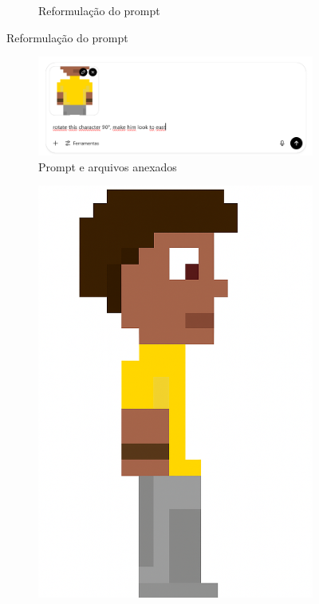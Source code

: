 \begin{figure}[htbp]
\begin{subfigure}{0.75\linewidth}
        \caption{\small Reformulação do prompt}
        \label{fig:chatGPT1c}
    \end{subfigure}
\end{figure}

\begin{figure}[htbp]
    \centering
    \caption{\small Processo da utilização 2 do chatGPT em julho/2025}
    \label{fig:chatGPT2}

    \begin{subfigure}{0.75\linewidth}
        \includegraphics[width=1\linewidth]{figs/chatGPT/visao_lateral/tela1.PNG}
        \caption{\small Prompt e arquivos anexados}
        \label{fig:chatGPT2a}
    \end{subfigure}
    \begin{subfigure}{0.2\linewidth}
        \includegraphics[width=1\linewidth]{figs/chatGPT/visao_lateral/res1.png}

\end{subfigure}
\end{figure}
